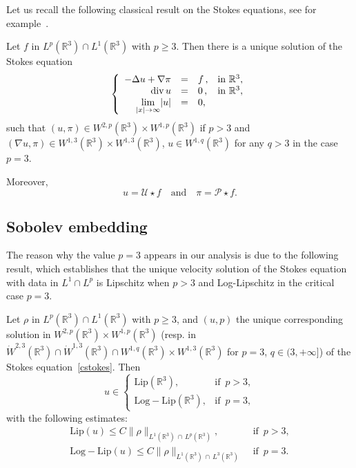 \documentclass[AHL,Unicode,longabstracts,published]{cedram}
\newcommand{\Lip}{\mathrm{Lip}}
\newcommand{\LLip}{\mathrm{Log-Lip}}
\newcommand{\R}{\mathbb{R}}
\newcommand{\clP}{\mathcal{P}}
\newcommand{\clU}{\mathcal{U}}
\renewcommand{\leq}{\leqslant}
\renewcommand{\geq}{\geqslant}
\renewcommand{\div}{\operatorname{div}}
\begin{document}
Let us recall the following classical result on the Stokes equations, see for example~\cite[Theorem~IV.2.1]{Galdi}.

\begin{prop}\label{class-Stokes}
Let $f $ in $L^p (\R^3) \cap L^1 (\R^3) $ with $p\geq 3$. Then there is a unique solution of the Stokes equation
\begin{equation}\label{cstokes}
\left\{
\begin{array}{rcll}
- \Delta u+ \nabla \pi &=& f \,,& \text{in $ \R^3$},\\
\div u & =&0\,,& \text{in $ \R^3$},\\
\underset{|x|\to \infty}{\lim}|u| &=& 0,
\end{array}
\right.
\end{equation}
such that $(u,\pi)\in W^{2,p} (\R^3) \times W^{1,p} (\R^3) $ if $p>3$ and $(\nabla u,\pi)\in W^{1,3} (\R^3) \times W^{1,3} (\R^3) $, $u\in W^{1,q}(\R^3)$ for any $q>3$ in the case $p=3$.

Moreover,
\begin{equation}\label{formu-conv}
u=\clU \star f \quad\text{and}\quad \pi=\clP \star f.
\end{equation}
\end{prop}



\subsection{Sobolev embedding}

The reason why the value $p=3$ appears in our analysis is due to the following result, which establishes that the unique velocity solution of the Stokes equation with data in $ L^1\cap L^p$ is Lipschitz when $p>3$ and Log-Lipschitz in the critical case $p=3$.


\begin{prop}\label{prop_log_lip_u}
Let $\rho$ in $L^p (\R^3) \cap L^1 (\R^3) $ with $p\geq 3$, and $(u,p) $ the unique corresponding solution in $W^{2,p} (\R^3) \times W^{1,p} (\R^3) $ (resp. in $\dot{W}^{2,3} (\R^3)\cap \dot{W}^{1,3}(\R^3)\cap W^{1,q}(\R^3) \times W^{1,3} (\R^3) $ for $p=3$, $q\in(3,+\infty]$) of the Stokes equation~\eqref{cstokes}. Then
\begin{equation}\label{uli}
u \in
\begin{cases}
\Lip \left(\R^3\right), & \text{if } \, p > 3,
\\ \LLip \left(\R^3\right), & \text{if } \, p = 3,
\end{cases}
\end{equation}
with the following estimates:
\begin{align}
\Lip(u) \leq C \| \rho\|_{L^1 \left(\R^3\right)\,\cap \,L^p \left(\R^3\right)}, & \text{ if } \, p > 3,\label{esti-uli}
\\ 
\LLip (u) \leq C \| \rho\|_{L^1 \left(\R^3\right)\,\cap \,L^3 \left(\R^3\right)} & \text{ if } \, p = 3.\label{esti-ulli}
\end{align}
\end{prop}
\end{document}
